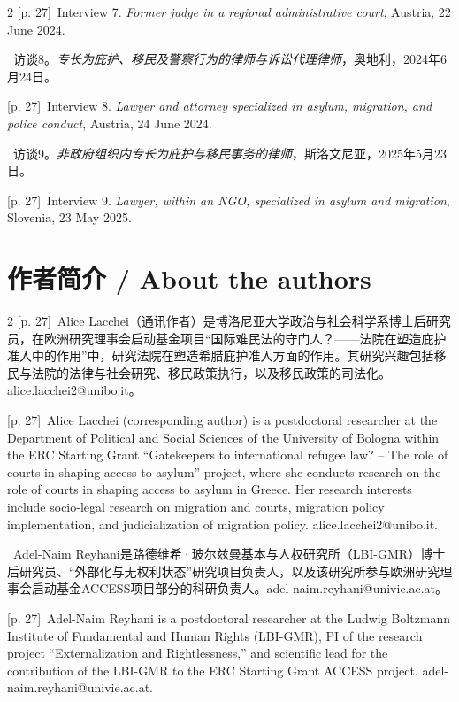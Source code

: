 \documentclass[10pt,a4paper]{article}
\begin{document}
\begin{paracol}{2}
\switchcolumn
{\scriptsize\color{gray} [p. 27]}\ Interview 7. \textit{Former judge in a regional administrative court}, Austria, 22 June 2024.\par
\switchcolumn*
{\scriptsize\color{gray} [p. 27]}\ 访谈8。\textit{专长为庇护、移民及警察行为的律师与诉讼代理律师}，奥地利，2024年6月24日。\par
\switchcolumn
{\scriptsize\color{gray} [p. 27]}\ Interview 8. \textit{Lawyer and attorney specialized in asylum, migration, and police conduct}, Austria, 24 June 2024.\par
\switchcolumn*
{\scriptsize\color{gray} [p. 27]}\ 访谈9。\textit{非政府组织内专长为庇护与移民事务的律师}，斯洛文尼亚，2025年5月23日。\par
\switchcolumn
{\scriptsize\color{gray} [p. 27]}\ Interview 9. \textit{Lawyer, within an NGO, specialized in asylum and migration}, Slovenia, 23 May 2025.\par
\switchcolumn*
\end{paracol}
\section*{作者简介 / About the authors}
\begin{paracol}{2}
{\scriptsize\color{gray} [p. 27]}\ Alice Lacchei（通讯作者）是博洛尼亚大学政治与社会科学系博士后研究员，在欧洲研究理事会启动基金项目“国际难民法的守门人？——法院在塑造庇护准入中的作用”中，研究法院在塑造希腊庇护准入方面的作用。其研究兴趣包括移民与法院的法律与社会研究、移民政策执行，以及移民政策的司法化。alice.lacchei2@unibo.it。\par
\switchcolumn
{\scriptsize\color{gray} [p. 27]}\ Alice Lacchei (corresponding author) is a postdoctoral researcher at the Department of Political and Social Sciences of the University of Bologna within the ERC Starting Grant “Gatekeepers to international refugee law? – The role of courts in shaping access to asylum” project, where she conducts research on the role of courts in shaping access to asylum in Greece. Her research interests include socio-legal research on migration and courts, migration policy implementation, and judicialization of migration policy. alice.lacchei2@unibo.it.\par
\switchcolumn*
{\scriptsize\color{gray} [p. 27]}\ Adel-Naim Reyhani是路德维希·玻尔兹曼基本与人权研究所（LBI-GMR）博士后研究员、“外部化与无权利状态”研究项目负责人，以及该研究所参与欧洲研究理事会启动基金ACCESS项目部分的科研负责人。adel-naim.reyhani@univie.ac.at。\par
\switchcolumn
{\scriptsize\color{gray} [p. 27]}\ Adel-Naim Reyhani is a postdoctoral researcher at the Ludwig Boltzmann Institute of Fundamental and Human Rights (LBI-GMR), PI of the research project “Externalization and Rightlessness,” and scientific lead for the contribution of the LBI-GMR to the ERC Starting Grant ACCESS project. adel-naim.reyhani@univie.ac.at.\par
\switchcolumn*
\end{paracol}
\end{document}
